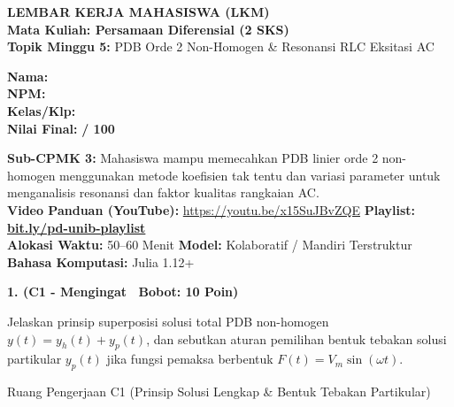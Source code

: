 \documentclass[10pt,a4paper]{article}
\begin{document}
\noindent\begin{minipage}[c]{0.68\textwidth}%
  {\large\textbf{\color{unibblue}LEMBAR KERJA MAHASISWA (LKM)}}\\[1mm]
  {\normalsize\textbf{Mata Kuliah: Persamaan Diferensial (2 SKS)}}\\[0.5mm]
  {\small\textbf{Topik Minggu 5:} PDB Orde 2 Non-Homogen \& Resonansi RLC Eksitasi AC}%
\end{minipage}%
\hfill%
\begin{minipage}[c]{0.30\textwidth}%
  \begin{tcolorbox}[colback=unibblue!5,colframe=unibblue,boxrule=0.6pt,arc=2pt,left=4pt,right=4pt,top=2pt,bottom=2pt]
    \scriptsize
    \textbf{Nama:} \dotfill\\[1.2mm]
    \textbf{NPM:} \dotfill\\[1.2mm]
    \textbf{Kelas/Klp:} \dotfill\\[1.2mm]
    \textbf{Nilai Final:} \hfill \textbf{/ 100}
  \end{tcolorbox}%
\end{minipage}\par

\vspace{1.5mm}

\begin{tcolorbox}[colback=boxbg,colframe=unibgold!90!black,boxrule=0.6pt,arc=2pt,left=5pt,right=5pt,top=3pt,bottom=3pt,title=\textbf{\scriptsize Capaian Pembelajaran (Sub-CPMK 3) \& Pedoman Evaluasi OBE}]
  \scriptsize
  \textbf{Sub-CPMK 3:} Mahasiswa mampu memecahkan PDB linier orde 2 non-homogen menggunakan metode koefisien tak tentu dan variasi parameter untuk menganalisis resonansi dan faktor kualitas rangkaian AC.\\
  \textbf{Video Panduan (YouTube):} \url{https://youtu.be/x15SuJBvZQE} \hfill \textbf{Playlist:} \href{https://www.youtube.com/playlist?list=PLS5oOZWXZeTw}{\color{unibblue}\textbf{bit.ly/pd-unib-playlist}}\\\textbf{Alokasi Waktu:} 50--60 Menit \quad\textbar\quad \textbf{Model:} Kolaboratif / Mandiri Terstruktur \quad\textbar\quad \textbf{Bahasa Komputasi:} Julia 1.12+
\end{tcolorbox}

\vspace{1mm}

\noindent\textbf{1. (C1 - Mengingat \textbar\ Bobot: 10 Poin)}\par\vspace{0.5mm}
{\footnotesize Jelaskan prinsip superposisi solusi total PDB non-homogen $y(t) = y_h(t) + y_p(t)$, dan sebutkan aturan pemilihan bentuk tebakan solusi partikular $y_p(t)$ jika fungsi pemaksa berbentuk $F(t) = V_m \sin(\omega t)$.}
\begin{answerbox}{Ruang Pengerjaan C1 (Prinsip Solusi Lengkap \& Bentuk Tebakan Partikular)}
  \vspace{2.0cm}
\end{answerbox}
\end{document}
